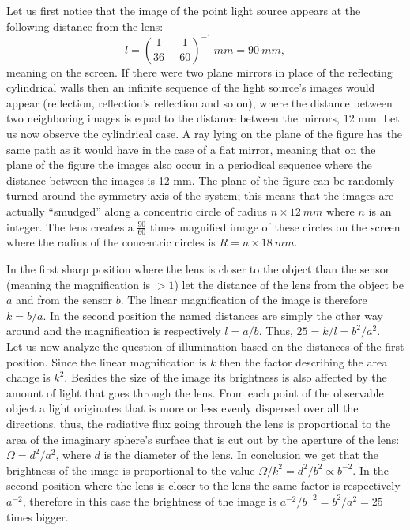 \documentclass[11pt]{article}
\begin{document}

\solueng
Let us first notice that the image of the point light source appears at the following distance from the lens:
$$l=\left(\frac 1{36}-\frac 1{60}\right)^{-1}\SI{}{mm}=\SI{90}{mm},$$ 
meaning on the screen. If there were two plane mirrors in place of the reflecting cylindrical walls then an infinite sequence of the light source’s images would appear (reflection, reflection’s reflection and so on), where the distance between two neighboring images is equal to the distance between the mirrors, 12 mm. Let us now observe the cylindrical case. A ray lying on the plane of the figure has the same path as it would have in the case of a flat mirror, meaning that on the plane of the figure the images also occur in a periodical sequence where the distance between the images is 12 mm. The plane of the figure can be randomly turned around the symmetry axis of the system; this means that the images are actually “smudged” along a concentric circle of radius $n\times\SI{12}{mm}$ where $n$ is an integer. The lens creates a $\frac{90}{60}$ times magnified image of these circles on the screen where the radius of the concentric circles is $R=n\times \SI{18}{mm}$.
\probend
\bigskip


\solueng
In the first sharp position where the lens is closer to the object than the sensor (meaning the magnification is $>1$) let the distance of the lens from the object be $a$ and from the sensor $b$. The linear magnification of the image is therefore $k=b/a$. In the second position the named distances are simply the other way around and the magnification is respectively $l=a/b$. Thus, $25=k/l=b^2/a^2$.\\
Let us now analyze the question of illumination based on the distances of the first position. Since the linear magnification is $k$ then the factor describing the area change is $k^2$. Besides the size of the image its brightness is also affected by the amount of light that goes through the lens. From each point of the observable object a light originates that is more or less evenly dispersed over all the directions, thus, the radiative flux going through the lens is proportional to the area of the imaginary sphere’s surface that is cut out by the aperture of the lens: $\Omega=d^2/a^2$, where $d$ is the diameter of the lens. In conclusion we get that the brightness of the image is proportional to the value $\Omega/k^2=d^2/b^2\propto b^{-2}$. In the second position where the lens is closer to the lens the same factor is respectively $a^{-2}$, therefore in this case the brightness of the image is $a^{-2}/b^{-2}=b^2/a^2=25$ times bigger.
\probend
\bigskip
\end{document}
